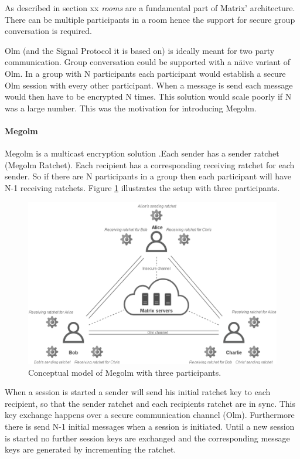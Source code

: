 As described in section xx \emph{rooms} are a fundamental part of Matrix' architecture. There can be multiple participants in a room hence the support for secure group conversation is required. 

Olm (and the Signal Protocol it is based on) is ideally meant for two party communication.
Group conversation could be supported with a näive variant of Olm. In a group with N participants each participant would establish a secure Olm session with every other participant. When a message is send each message would then have to be encrypted N times. This solution would scale poorly if N was a large number. This was the motivation for introducing Megolm.

\paragraph{Megolm}

Megolm is a multicast encryption solution \cite{sok}.Each sender has a sender ratchet (Megolm Ratchet). Each recipient has a corresponding receiving ratchet for each sender. So if there are N participants in a group then each participant will have N-1 receiving ratchets. Figure \ref{fig:megolm} illustrates the setup with three participants. 

\begin{figure}[H]
	\hspace*{-1cm} 
	\centering
	\includegraphics[width=14cm]{figures/megolm_conceptual.png}
	\caption{Conceptual model of Megolm with three participants.}
	\label{fig:megolm}
\end{figure}

When a session is started a sender will send his initial ratchet key to each recipient, so that the sender ratchet and each recipients ratchet are in sync. This key exchange happens over a secure communication channel (Olm). Furthermore there is send N-1 initial messages when a session is initiated. Until a new session is started no further session keys are exchanged and the corresponding message keys are generated by incrementing the ratchet.

